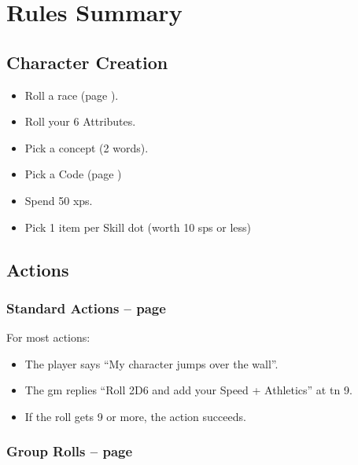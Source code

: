 \section*{Rules Summary}

\begin{multicols}{2}

\subsection{Character Creation}

\begin{itemize}

  \item
  Roll a race (page \pageref{raceRoll}).
  \item
  Roll your 6 Attributes.
  \item
  Pick a concept (2 words).
  \item
  Pick a Code (page \pageref{gods_codes})
  \item
  Spend 50 \glspl{xp}.
  \item
  Pick 1 item per Skill dot (worth 10 \glspl{sp} or less)

\end{itemize}

\subsection{Actions}

\subsubsection{Standard Actions -- page \pageref{basicaction}}

For most actions:

\begin{itemize}

  \item
  The player says ``My character jumps over the wall''.
  \item
  The \gls{gm} replies ``Roll 2D6 and add your Speed + Athletics'' at \gls{tn} 9.
  \item
  If the roll gets 9 or more, the action succeeds.

\end{itemize}

\subsubsection{Group Rolls -- page \pageref{grouproll}}


\end{multicols}
